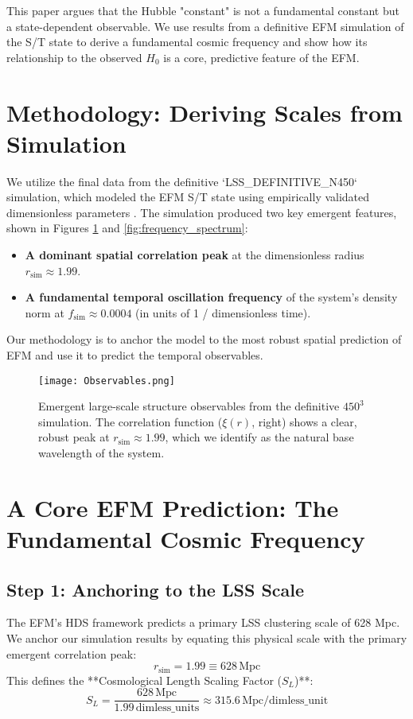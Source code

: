 \documentclass[11pt]{article}
\begin{document}
This paper argues that the Hubble "constant" is not a fundamental constant but a state-dependent observable. We use results from a definitive EFM simulation of the S/T state to derive a fundamental cosmic frequency and show how its relationship to the observed \(H_0\) is a core, predictive feature of the EFM.

\section{Methodology: Deriving Scales from Simulation}
We utilize the final data from the definitive `LSS_DEFINITIVE_N450` simulation, which modeled the EFM S/T state using empirically validated dimensionless parameters \citep{emvula2025params}. The simulation produced two key emergent features, shown in Figures \ref{fig:lss_observables} and \ref{fig:frequency_spectrum}:
\begin{itemize}
    \item \textbf{A dominant spatial correlation peak} at the dimensionless radius \(r_{\text{sim}} \approx 1.99\).
    \item \textbf{A fundamental temporal oscillation frequency} of the system's density norm at \(f_{\text{sim}} \approx 0.0004\) (in units of 1 / dimensionless time).
\end{itemize}

Our methodology is to anchor the model to the most robust spatial prediction of EFM and use it to predict the temporal observables.

\begin{figure}[h!]
\centering
\texttt{[image: Observables.png]}
\caption{Emergent large-scale structure observables from the definitive \(450^3\) simulation. The correlation function (\(\xi(r)\), right) shows a clear, robust peak at \(r_{\text{sim}} \approx 1.99\), which we identify as the natural base wavelength of the system.}
\label{fig:lss_observables}
\end{figure}

\section{A Core EFM Prediction: The Fundamental Cosmic Frequency}

\subsection{Step 1: Anchoring to the LSS Scale}
The EFM's HDS framework predicts a primary LSS clustering scale of 628 Mpc. We anchor our simulation results by equating this physical scale with the primary emergent correlation peak:
\begin{equation}
r_{\text{sim}} = 1.99 \equiv 628 \, \text{Mpc}
\end{equation}
This defines the **Cosmological Length Scaling Factor ($S_L$)**:
\begin{equation}
S_L = \frac{628 \, \text{Mpc}}{1.99 \, \text{dimless\_units}} \approx 315.6 \, \text{Mpc/dimless\_unit}
\end{equation}
\end{document}
